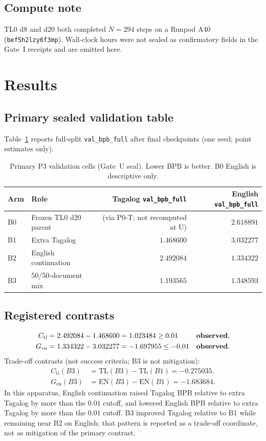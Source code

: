 \documentclass[11pt,a4paper]{article}
\begin{document}
\subsection{Compute note}
TL0 d8 and d20 both completed $N=294$ steps on a Runpod A40 (\texttt{bef5h2lzy6f3mp}). Wall-clock hours were not sealed as confirmatory fields in the Gate~I receipts and are omitted here.

\section{Results}
\label{sec:results}

\subsection{Primary sealed validation table}
Table~\ref{tab:primary} reports full-split \texttt{val\_bpb\_full} after final checkpoints (one seed; point estimates only).

\begin{table}[ht]
\centering
\caption{Primary P3 validation cells (Gate~U seal). Lower BPB is better. B0 English is descriptive only.}
\label{tab:primary}
\begin{tabular}{llrr}
\toprule
Arm & Role & Tagalog \texttt{val\_bpb\_full} & English \texttt{val\_bpb\_full} \\
\midrule
B0 & Frozen TL0 d20 parent & (via P0-T; not recomputed at U) & $2.618891$ \\
B1 & Extra Tagalog & $1.468600$ & $3.032277$ \\
B2 & English continuation & $2.492084$ & $1.334322$ \\
B3 & 50/50-document mix & $1.193565$ & $1.348593$ \\
\bottomrule
\end{tabular}
\end{table}

\subsection{Registered contrasts}
\begin{align}
C_{\mathrm{tl}}&=2.492084-1.468600=1.023484\ge 0.01 &&\text{\textbf{observed}},\\
G_{\mathrm{en}}&=1.334322-3.032277=-1.697955\le -0.01 &&\text{\textbf{observed}}.
\end{align}
Trade-off contrasts (not success criteria; B3 is not mitigation):
\begin{align}
C_{\mathrm{tl}}(B3)&=\mathrm{TL}(B3)-\mathrm{TL}(B1)=-0.275035,\\
G_{\mathrm{en}}(B3)&=\mathrm{EN}(B3)-\mathrm{EN}(B1)=-1.683684.
\end{align}
In this apparatus, English continuation raised Tagalog BPB relative to extra Tagalog by more than the $0.01$ cutoff, and lowered English BPB relative to extra Tagalog by more than the $0.01$ cutoff. B3 improved Tagalog relative to B1 while remaining near B2 on English; that pattern is reported as a trade-off coordinate, not as mitigation of the primary contrast.
\end{document}
